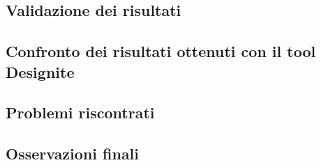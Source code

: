     \subsection{Validazione dei risultati}
        
    \newpage
    \subsection{Confronto dei risultati ottenuti con il tool Designite}
        
    
    \subsection{Problemi riscontrati}
        
        
    \subsection{Osservazioni finali}
        
    